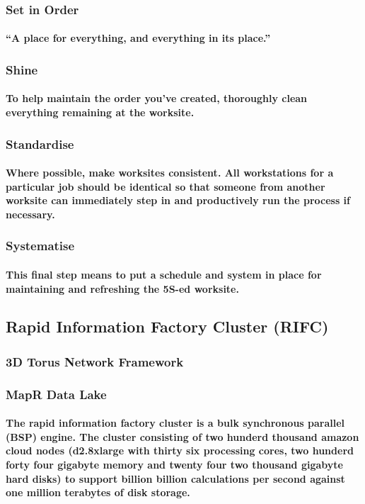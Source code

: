 \documentclass{acm_proc_article-sp}
\begin{document}
\subsubsection{Set in Order}
\paragraph{“A place for everything, and everything in its place.” }
\subsubsection{Shine}
\paragraph{To help maintain the order you’ve created, thoroughly clean everything remaining at the worksite.}
\subsubsection{Standardise}
\paragraph{Where possible, make worksites consistent. All workstations for a particular job should be identical so that someone from another worksite can immediately step in and productively run the process if necessary.}
\subsubsection{Systematise}
\paragraph{This final step means to put a schedule and system in place for maintaining and refreshing the 5S-ed worksite.}
\newpage
\subsection{Rapid Information Factory Cluster (RIFC)}
\subsubsection{3D Torus Network Framework}
\subsubsection{MapR Data Lake}
\paragraph{The rapid information factory cluster is a bulk synchronous parallel (BSP) engine. The cluster consisting of two hunderd thousand amazon cloud nodes (d2.8xlarge with thirty six processing cores, two hunderd forty four gigabyte memory and twenty four two thousand gigabyte hard disks) to support billion billion calculations per second against one million terabytes of disk storage.}
\end{document}
